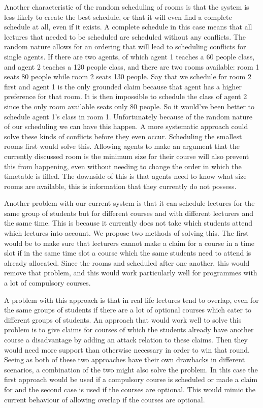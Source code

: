 Another characteristic of the random scheduling of rooms is that the system is
less likely to create the best schedule, or that it will even find a complete
schedule at all, even if it exists. A complete schedule in this case means that
all lectures that needed to be scheduled are scheduled without any conflicts.
The random nature allows for an ordering that will lead to scheduling conflicts
for single agents. If there are two agents, of which agent 1 teaches a 60 people
class, and agent 2 teaches a 120 people class, and there are two rooms
available: room 1 seats 80 people while room 2 seats 130 people. Say that we
schedule for room 2 first and agent 1 is the only grounded claim because that
agent has a higher preference for that room. It is then impossible to schedule
the class of agent 2 since the only room available seats only 80 people. So it
would've been better to schedule agent 1's class in room 1. Unfortunately
because of the random nature of our scheduling we can have this happen. A more
systematic approach could solve these kinds of conflicts before they even occur.
Scheduling the smallest rooms first would solve this. Allowing agents to make
an argument that the currently discussed room is the minimum size for their
course will also prevent this from happening, even without needing to change the
order in which the timetable is filled. The downside of this is that agents need
to know what size rooms are available, this is information that they currently
do not possess.

Another problem with our current system is that it can schedule lectures
for the same group of students but for different courses and with
different lecturers and the same time. This is because it currently does
not take which students attend which lectures into account. We propose two
methods of solving this. The first would be to make sure that lecturers
cannot make a claim for a course in a time slot if in the same time slot a
course which the same students need to attend is already allocated. Since
the rooms and scheduled after one another, this would remove that problem,
and this would work particularly well for programmes with a lot of
compulsory courses. 

A problem with this approach is that in real life lectures tend to overlap,
even for the same groups of students if there are a lot of optional courses
which cater to different groups of students. An approach that would work
well to solve this problem is to give claims for courses of which the
students already have another course a disadvantage by adding an attack
relation to these claims. Then they would need more support than otherwise
necessary in order to win that round. Seeing as both of these two
approaches have their own drawbacks in different scenarios, a combination
of the two might also solve the problem.  In this case the first approach
would be used if a compulsory course is scheduled or made a claim for and
the second case is used if the courses are optional. This would mimic the
current behaviour of allowing overlap if the courses are optional.

